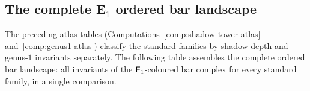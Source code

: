 \subsection{The complete E$_1$ ordered bar landscape}%
\label{subsec:e1-ordered-bar-landscape}%
%

The preceding atlas tables
(Computations~\ref{comp:shadow-tower-atlas}
and~\ref{comp:genus1-atlas}) classify the standard
families by shadow depth and genus-$1$ invariants
separately. The following table assembles the
complete ordered bar landscape: all invariants of the
$\mathsf{E}_1$-coloured bar complex for every standard family,
in a single comparison.

\begin{computation}%
\label{comp:e1-ordered-bar-landscape}%
%
%
%
%


\end{computation}
